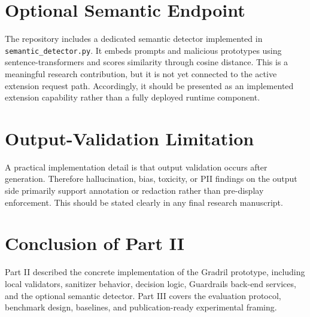 \documentclass[journal]{IEEEtran}
\begin{document}
\section{Optional Semantic Endpoint}
The repository includes a dedicated semantic detector implemented in \texttt{semantic\_detector.py}. It embeds prompts and malicious prototypes using sentence-transformers and scores similarity through cosine distance. This is a meaningful research contribution, but it is not yet connected to the active extension request path. Accordingly, it should be presented as an implemented extension capability rather than a fully deployed runtime component.

\section{Output-Validation Limitation}
A practical implementation detail is that output validation occurs after generation. Therefore hallucination, bias, toxicity, or PII findings on the output side primarily support annotation or redaction rather than pre-display enforcement. This should be stated clearly in any final research manuscript.

\section{Conclusion of Part II}
Part II described the concrete implementation of the Gradril prototype, including local validators, sanitizer behavior, decision logic, Guardrails back-end services, and the optional semantic detector. Part III covers the evaluation protocol, benchmark design, baselines, and publication-ready experimental framing.
\end{document}
